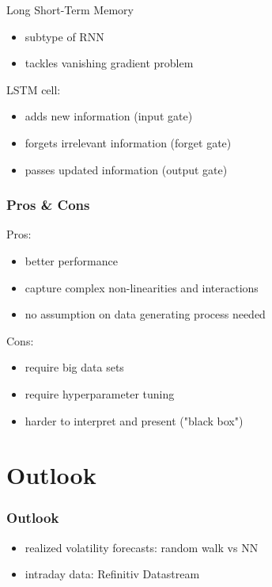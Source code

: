 \documentclass[handout]{beamer}
\begin{document}
\begin{frame}{Long Short-Term Memory}
\begin{itemize}
    \item subtype of RNN
    \pause
    \item tackles vanishing gradient problem
\end{itemize}

\vspace{10mm}

\pause
LSTM cell:
\begin{itemize}
    \item adds new information (input gate) 
    \pause
    \item forgets irrelevant information (forget gate)
    \pause
    \item passes updated information (output gate)
\end{itemize}

\end{frame}

\begin{frame}
\frametitle{Pros \& Cons}
Pros:
\begin{itemize}
\item better performance
\pause
\item capture complex non-linearities and interactions 
\pause
\item no assumption on data generating process needed
\pause
\end{itemize}

\vspace{5mm}

Cons:
\begin{itemize}
\item require big data sets
\pause
\item require hyperparameter tuning
\pause
\item harder to interpret and present ("black box")
\end{itemize}
\end{frame}

\section{Outlook}

\begin{frame}
\frametitle{Outlook}
\begin{itemize}
    \item realized volatility forecasts: random walk vs NN 
    \item intraday data: Refinitiv Datastream 
\end{itemize}
\end{frame}
\end{document}
